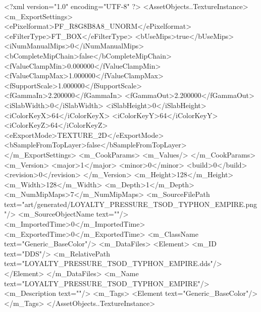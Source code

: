 <?xml version="1.0" encoding="UTF-8" ?>
<AssetObjects..TextureInstance>
	<m_ExportSettings>
		<ePixelformat>PF_R8G8B8A8_UNORM</ePixelformat>
		<eFilterType>FT_BOX</eFilterType>
		<bUseMips>true</bUseMips>
		<iNumManualMips>0</iNumManualMips>
		<bCompleteMipChain>false</bCompleteMipChain>
		<fValueClampMin>0.000000</fValueClampMin>
		<fValueClampMax>1.000000</fValueClampMax>
		<fSupportScale>1.000000</fSupportScale>
		<fGammaIn>2.200000</fGammaIn>
		<fGammaOut>2.200000</fGammaOut>
		<iSlabWidth>0</iSlabWidth>
		<iSlabHeight>0</iSlabHeight>
		<iColorKeyX>64</iColorKeyX>
		<iColorKeyY>64</iColorKeyY>
		<iColorKeyZ>64</iColorKeyZ>
		<eExportMode>TEXTURE_2D</eExportMode>
		<bSampleFromTopLayer>false</bSampleFromTopLayer>
	</m_ExportSettings>
	<m_CookParams>
		<m_Values/>
	</m_CookParams>
	<m_Version>
		<major>1</major>
		<minor>0</minor>
		<build>0</build>
		<revision>0</revision>
	</m_Version>
	<m_Height>128</m_Height>
	<m_Width>128</m_Width>
	<m_Depth>1</m_Depth>
	<m_NumMipMaps>7</m_NumMipMaps>
	<m_SourceFilePath text="art/generated/LOYALTY_PRESSURE_TSOD_TYPHON_EMPIRE.png"/>
	<m_SourceObjectName text=""/>
	<m_ImportedTime>0</m_ImportedTime>
	<m_ExportedTime>0</m_ExportedTime>
	<m_ClassName text="Generic_BaseColor"/>
	<m_DataFiles>
		<Element>
			<m_ID text="DDS"/>
			<m_RelativePath text="LOYALTY_PRESSURE_TSOD_TYPHON_EMPIRE.dds"/>
		</Element>
	</m_DataFiles>
	<m_Name text="LOYALTY_PRESSURE_TSOD_TYPHON_EMPIRE"/>
	<m_Description text=""/>
	<m_Tags>
		<Element text="Generic_BaseColor"/>
	</m_Tags>
</AssetObjects..TextureInstance>
